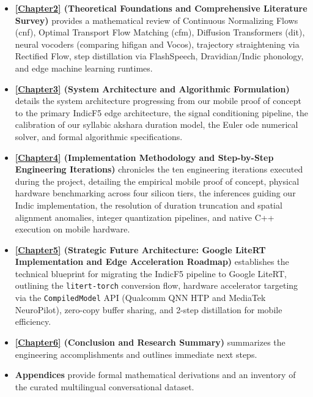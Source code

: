 \begin{itemize}
    \item \textbf{\cref{Chapter2} (Theoretical Foundations and Comprehensive Literature Survey)} provides a mathematical review of Continuous Normalizing Flows (\acrshort{cnf}), Optimal Transport Flow Matching (\acrshort{cfm}), Diffusion Transformers (\acrshort{dit}), neural vocoders (comparing \acrshort{hifigan} and Vocos), trajectory straightening via Rectified Flow, step distillation via FlashSpeech, Dravidian/Indic phonology, and edge machine learning runtimes.
    \item \textbf{\cref{Chapter3} (System Architecture and Algorithmic Formulation)} details the system architecture progressing from our mobile proof of concept to the primary IndicF5 edge architecture, the signal conditioning pipeline, the calibration of our syllabic akshara duration model, the Euler \acrshort{ode} numerical solver, and formal algorithmic specifications.
    \item \textbf{\cref{Chapter4} (Implementation Methodology and Step-by-Step Engineering Iterations)} chronicles the ten engineering iterations executed during the project, detailing the empirical mobile proof of concept, physical hardware benchmarking across four silicon tiers, the inferences guiding our Indic implementation, the resolution of duration truncation and spatial alignment anomalies, integer quantization pipelines, and native C++ execution on mobile hardware.
    \item \textbf{\cref{Chapter5} (Strategic Future Architecture: Google LiteRT Implementation and Edge Acceleration Roadmap)} establishes the technical blueprint for migrating the IndicF5 pipeline to Google LiteRT, outlining the \texttt{litert-torch} conversion flow, hardware accelerator targeting via the \texttt{CompiledModel} API (Qualcomm QNN HTP and MediaTek NeuroPilot), zero-copy buffer sharing, and 2-step distillation for mobile efficiency.
    \item \textbf{\cref{Chapter6} (Conclusion and Research Summary)} summarizes the engineering accomplishments and outlines immediate next steps.
    \item \textbf{Appendices} provide formal mathematical derivations and an inventory of the curated multilingual conversational dataset.
\end{itemize}
